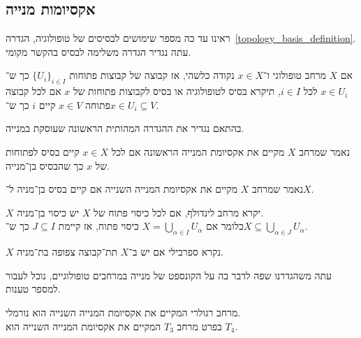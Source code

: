 \subsection{אקסיומות מנייה}
ראינו עד כה מספר שימושים לבסיסים של טופולוגיה, הגדרה\ \ref{topology_basis_definition}.
עתה נגדיר הגדרה משלימה לבסיס בהקשר מקומי.
\begin{definition}
	אם $X$ מרחב טופולוגי ו־$x \in X$ נקודה כלשהי,
	אז קבוצה של קבוצות פתוחות ${\{ U_i \}}_{i \in I}$ כך ש־$x \in U_i$ לכל $i \in I$,
	תיקרא בסיס לטופולוגיה או בסיס לקבוצות פתוחות של $x$ אם לכל קבוצה פתוחה $x \in V$ קיים $i$ כך ש־$x \in U_i \subseteq V$.
\end{definition}
בהתאם נגדיר את ההגדרה המהותית הראשונה שעוסקת במנייה.
\begin{definition}
	נאמר שמרחב $X$ מקיים את אקסיומת המנייה הראשונה אם לכל $x \in X$ קיים בסיס לפתוחות של $x$ כך שהבסיס בן־מנייה.
\end{definition}
\begin{definition}
	נאמר שמרחב $X$ מקיים את אקסיומת המנייה השנייה אם קיים בסיס בן־מניה ל־$X$.
\end{definition}
\begin{definition}
	$X$ יקרא מרחב לינדולף, אם לכל כיסוי פתוח של $X$ יש כיסוי בן־מניה. \\
	כלומר אם $X = \bigcup_{\alpha \in I} U_{\alpha}$ כיסוי פתוח, אז קיימת $J \subseteq I$ כך ש־$X \subseteq \bigcup_{\alpha \in J} U_{\alpha}$.
\end{definition}
\begin{definition}
	$X$ נקרא ספרבילי אם יש ב־$X$ תת־קבוצה צפופה בת־מניה.
\end{definition}
עתה משהגדרנו שפה לדבר בה על הקונספט של מנייה במרחבים טופולוגיים, נוכל לעבור למספר טענות.
\begin{proposition}
	מרחב רגולרי המקיים את אקסיומת המנייה השנייה הוא נורמלי. \\
	בפרט מרחב $T_3$ המקיים את אקסיומת המנייה השנייה הוא $T_4$.
\end{proposition}
